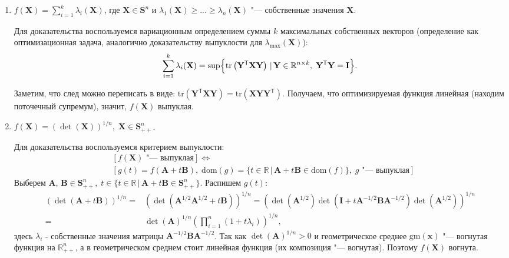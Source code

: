 \documentclass[a4paper,12pt]{article}
\begin{document}
\begin{enumerate}
\begin{enumerate}
			\item 
			
			$f(\mathbf{X}) = \sum_{i=1}^k \lambda_i(\mathbf{X})$, где $\mathbf{X}\in\mathbf{S}^n$ и $\lambda_1(\mathbf{X}) \geqslant ... \geqslant \lambda_n(\mathbf{X})$ "--- собственные значения $\mathbf{X}$.
			
			Для доказательства воспользуемся вариационным определением суммы $k$ максимальных собственных векторов (определение как оптимизационная задача, аналогично доказательству выпуклости для $\lambda_{\text{max}}(\mathbf{X})$):
			\begin{equation*}
				\sum_{i=1}^k \lambda_i(\mathbf{X}) = \sup \Bigl\{ \text{tr}\left( \mathbf{Y}^\mathsf{T} \mathbf{X} \mathbf{Y}\right) \,|\, \mathbf{Y}\in \mathbb{R}^{n\times k},\; \mathbf{Y}^\mathsf{T} \mathbf{Y} = \mathbf{I}  \Bigr\}.
			\end{equation*} 
			
			Заметим, что след можно переписать в виде: $\text{tr}\left( \mathbf{Y}^\mathsf{T} \mathbf{X} \mathbf{Y}\right) = \text{tr}\left(\mathbf{X} \mathbf{Y} \mathbf{Y}^\mathsf{T} \right) $. Получаем, что оптимизируемая функция линейная (находим поточечный супремум), значит, $f(\mathbf{X})$ выпуклая.
			
			\item 
			$f(\mathbf{X}) = (\det(\mathbf{X}))^{1/n},\; \mathbf{X}\in\mathbf{S}^n_{++}$.
			
			Для доказательства воспользуемся критерием выпуклости:
			\begin{equation*}\begin{aligned}
			&\left[ f(\mathbf{X}) \text{ "--- выпуклая} \right]\iff \\
			&\left[  g(t) = f(\mathbf{A} + t\mathbf{B}),\; \text{dom}(g) = \{t\in\mathbb{R}\,|\, \mathbf{A} + t\mathbf{B} \in \text{dom}(f) \},\; g \text{ "--- выпуклая} \right]
			\end{aligned}\end{equation*} 
			Выберем $\mathbf{A},\,\mathbf{B}\in \mathbf{S}^n_{++},\; t\in \{t\in\mathbb{R}\,|\, \mathbf{A} + t\mathbf{B} \in \mathbf{S}^n_{++} \}$. Распишем $g(t)$:
			\begin{equation*}\begin{aligned}
				(\det(\mathbf{A} + t \mathbf{B}))^{1/n} = & (\det(\mathbf{A}^{1/2} \mathbf{A}^{1/2} + t \mathbf{B}))^{1/n} = 
				(\det(\mathbf{A}^{1/2})\det(\mathbf{I} + t \mathbf{A}^{-1/2} \mathbf{B}\mathbf{A}^{-1/2})\det(\mathbf{A}^{1/2}))^{1/n} \\
				= & \det(\mathbf{A})^{1/n} \left( \prod_{i=1}^n (1 + t\lambda_i) \right)^{1/n}, 
			\end{aligned}\end{equation*}
			здесь $\lambda_i$ - собственные значения матрицы $\mathbf{A}^{-1/2} \mathbf{B}\mathbf{A}^{-1/2}$. Так как $\det(\mathbf{A})^{1/n} > 0$ и геометрическое среднее $\text{gm}(\mathbf{x})$ "--- вогнутая функция на $\mathbb{R}_{++}^n$, а в геометрическом среднем стоит линейная функция (их композиция "--- вогнутая). Поэтому $f(\mathbf{X})$ вогнута.
			

\end{enumerate}
\end{enumerate}
\end{document}
